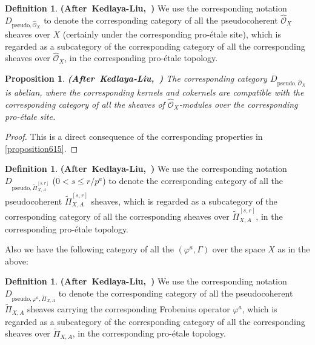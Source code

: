 \documentclass[12pt]{amsart}
\newtheorem{proposition}[theorem]{Proposition}
\theoremstyle{definition}
\newtheorem{definition}[theorem]{Definition}
\numberwithin{equation}{section}
\begin{document}
\begin{definition}\mbox{\bf{(After Kedlaya-Liu, \cite[Definition 8.4.1]{KL16})}}
We use the corresponding notation $D_{\mathrm{pseudo},\widehat{\mathcal{O}}_X}$ to denote the corresponding category of all the pseudocoherent $\widehat{\mathcal{O}}_X$ sheaves over $X$ (certainly under the corresponding pro-\'etale site), which is regarded as a subcategory of the corresponding category of all the corresponding sheaves over $\widehat{\mathcal{O}}_X$, in the corresponding pro-\'etale topology.	
\end{definition}





\begin{proposition} \mbox{\bf{(After Kedlaya-Liu, \cite[Theorem 8.4.3]{KL16})}}
The corresponding category $D_{\mathrm{pseudo},\widehat{\mathcal{O}}_X}$ is abelian, where the corresponding kernels and cokernels are compatible with the corresponding category of all the sheaves of $\widehat{\mathcal{O}}_X$-modules over the corresponding pro-\'etale site.	
\end{proposition}

\begin{proof}
This is a direct consequence of the corresponding properties in \cref{proposition615}.	
\end{proof}








\begin{definition}\mbox{\bf{(After Kedlaya-Liu, \cite[Definition 8.10.1]{KL16})}}
We use the corresponding notation $D_{\mathrm{pseudo},\widetilde{\Pi}^{[s,r]}_{X,A}}$ ($0<s\leq r/p^{a}$) to denote the corresponding category of all the pseudocoherent $\widetilde{\Pi}^{[s,r]}_{X,A}$ sheaves, which is regarded as a subcategory of the corresponding category of all the corresponding sheaves over $\widetilde{\Pi}^{[s,r]}_{X,A}$, in the corresponding pro-\'etale topology.	
\end{definition}


\indent Also we have the following category of all the $(\varphi^a,\Gamma)$ over the space $X$ as in the above:


\begin{definition}\mbox{\bf{(After Kedlaya-Liu, \cite[Definition 8.10.5]{KL16})}}
We use the corresponding notation $D_{\mathrm{pseudo},\varphi^a,\widetilde{\Pi}_{X,A}}$ to denote the corresponding category of all the pseudocoherent $\widetilde{\Pi}_{X,A}$ sheaves carrying the corresponding Frobenius operator $\varphi^a$, which is regarded as a subcategory of the corresponding category of all the corresponding sheaves over $\widetilde{\Pi}_{X,A}$, in the corresponding pro-\'etale topology.	
\end{definition}
\end{document}
